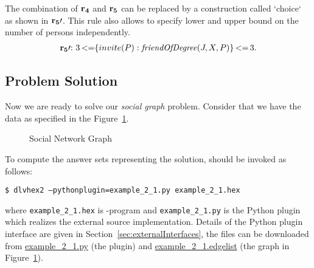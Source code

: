 \documentclass[a4paper, titlepage]{article}
\newcommand{\mi}[1]{\mathit{#1}}
\DeclareMathOperator{\lesseq}{<=}
\newcommand{\exampledownloadlink}[2]{\href{https://github.com/hexhex/manual/raw/master/#1}{#2}}
\newcommand\leftaligned[1]{\par \smallskip \noindent \qquad #1 \smallskip \par}
\newcommand{\row}[1]{%
  \ensuremath{\color{black}\ensuremath{\mathbf{#1}} \color{black}}%
}
\newcommand{\rowprefixprime}[1]{%
  \ensuremath{\color{black}\mathbf{#1\prime{:}}\ }%
}
\begin{document}
The combination of $\row{r_4}$ and $\row{r_5}$
can be replaced by a construction called `choice`
as shown in $\row{r_5}\prime$.
This rule also allows to specify lower and upper bound
on the number of persons independently.
\begin{align*}
\rowprefixprime{r_5} 3 \lesseq \{ invite(P) : \mi{friendOfDegree}(J,X,P) \} \lesseq 3.
\end{align*} 

\subsection{Problem Solution}
Now we are ready to solve our \emph{social graph} problem. 
Consider that we have the data as specified in the Figure~\ref{fig:socialnetwork}.
\begin{figure}
\begin{center}
\end{center}
\caption{Social Network Graph}
\label{fig:socialnetwork}
\end{figure}
To compute the answer sets representing 
the solution, \dlvhex{} should be invoked as follows:
%
\leftaligned{\texttt{\$ dlvhex2 --pythonplugin=example\_2\_1.py example\_2\_1.hex}}
%
where \texttt{example\_2\_1.hex} is \hex-program and 
\texttt{example\_2\_1.py} is the Python plugin which realizes
the external source implementation.
Details of the Python plugin interface
are given in Section~\ref{sec:externalInterfaces},
the files can be downloaded from
\exampledownloadlink{example_2_1/example_2_1.py}{example\_2\_1.py}
(the plugin)
and
\exampledownloadlink{example_2_1/example_2_1.edgelist}{example\_2\_1.edgelist}
(the graph in Figure~\ref{fig:socialnetwork}).
\end{document}
